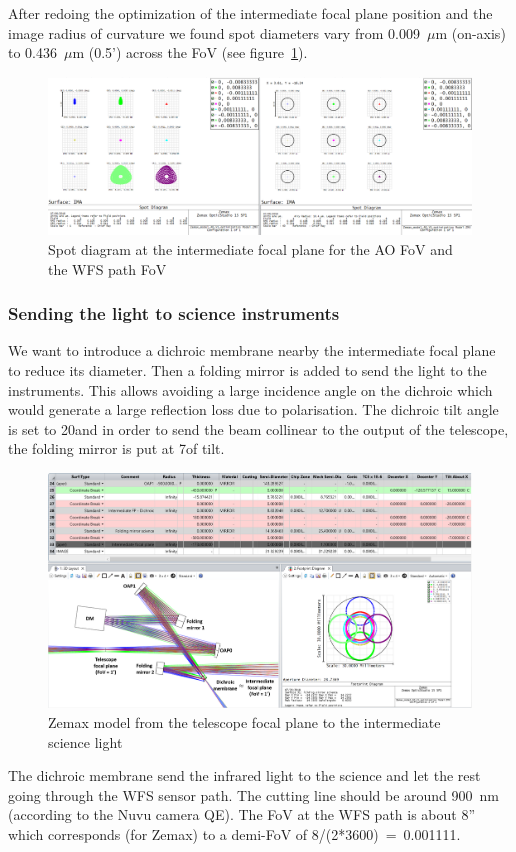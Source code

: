 \documentclass[12pt,a4paper]{article}
\begin{document}
After redoing the optimization of the intermediate focal plane position and the image radius of curvature we found spot diameters vary from 0.009~$\mu$m (on-axis) to 0.436~$\mu$m (0.5') across the FoV (see figure~\ref{fig:IntermediateFP_SpotDiagram}).\\
\begin{figure}[H]
	\begin{center}
		\includegraphics[width=.8\textwidth]{images/IntermediateFP_SpotDiagram.PNG}
		\caption{Spot diagram at the intermediate focal plane for the AO FoV and the WFS path FoV}\label{fig:IntermediateFP_SpotDiagram}
	\end{center}
\end{figure}

\subsubsection{Sending the light to science instruments}
We want to introduce a dichroic membrane nearby the intermediate focal plane to reduce its diameter. Then a folding mirror is added to send the light to the instruments. This allows avoiding a large incidence angle on the dichroic which would generate a large reflection loss due to polarisation. The dichroic tilt angle is set to 20\degree and in order to send the beam collinear to the output of the telescope, the folding mirror is put at 7\degree of tilt.
\begin{figure}[H]
	\begin{center}
		\includegraphics[width=\textwidth]{images/Zemax_model_FP_Dichroic.PNG}
		\caption{Zemax model from the telescope focal plane to the intermediate science light}\label{fig:Zemax_model_FP_Dichroic}
	\end{center}
\end{figure}
The dichroic membrane send the infrared light to the science and let the rest going through the WFS sensor path. The cutting line should be around 900~nm (according to the Nuvu camera QE). The FoV at the WFS path is about 8'' which corresponds (for Zemax) to a demi-FoV of 8/(2*3600)~=~0.001111\degree.\\
\end{document}

